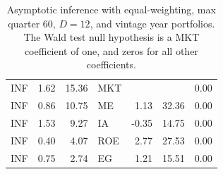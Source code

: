 \documentclass[12pt]{article}
\begin{document}
\begin{table}[ht]
\begin{tabular}{lrrlrrr}
		\hline
		INF & 1.62 & 15.36 & MKT &  &  & 0.00 \\ 
		INF & 0.86 & 10.75 & ME & 1.13 & 32.36 & 0.00 \\ 
		INF & 1.53 & 9.27 & IA & -0.35 & 14.75 & 0.00 \\ 
		INF & 0.40 & 4.07 & ROE & 2.77 & 27.53 & 0.00 \\ 
		INF & 0.75 & 2.74 & EG & 1.21 & 15.51 & 0.00 \\ 
		\hline
		\hline
	\end{tabular}
	\caption{Asymptotic inference with equal-weighting, max quarter 60, $D=12$, and vintage year portfolios. The Wald test null hypothesis is a MKT coefficient of one, and zeros for all other coefficients.} 
	\label{tab:ai_60_ew_dep_vyp}
\end{table}

\end{document}
